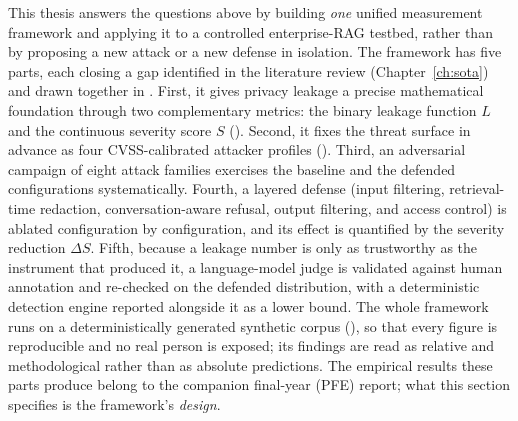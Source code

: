 \documentclass[12pt,a4paper]{report}
\begin{document}
This thesis answers the questions above by building \emph{one} unified measurement framework and
applying it to a controlled enterprise-RAG testbed, rather than by proposing a new attack or a new
defense in isolation. The framework has five parts, each closing a gap identified in the literature
review (Chapter~\ref{ch:sota}) and drawn together in . First, it gives privacy
leakage a precise mathematical foundation through two complementary metrics: the binary leakage
function $L$ and the continuous severity score $S$ (). Second, it fixes the
threat surface in advance as four CVSS-calibrated attacker profiles (). Third,
an adversarial campaign of eight attack families exercises the baseline and the defended
configurations systematically. Fourth, a layered defense (input filtering, retrieval-time
redaction, conversation-aware refusal, output filtering, and access control) is ablated
configuration by configuration, and its effect is quantified by the severity reduction $\Delta S$.
Fifth, because a leakage number is only as trustworthy as the instrument that produced it, a
language-model judge is validated against human annotation and re-checked on the defended
distribution, with a deterministic detection engine reported alongside it as a lower bound. The whole
framework runs on a deterministically generated synthetic corpus (), so that
every figure is reproducible and no real person is exposed; its findings are read as relative and
methodological rather than as absolute predictions. The empirical results these parts produce belong
to the companion final-year (PFE) report; what this section specifies is the framework's \emph{design}.
\end{document}
